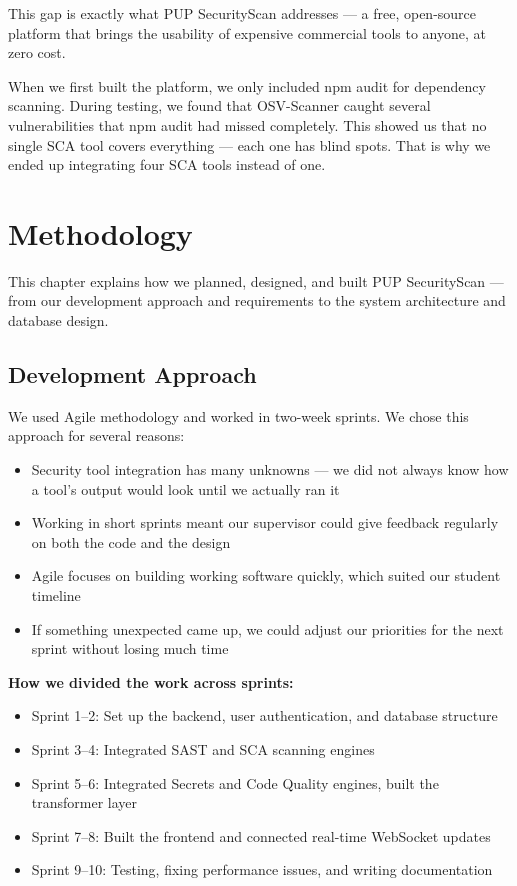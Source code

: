 \documentclass[12pt,a4paper]{report}
\begin{document}
This gap is exactly what PUP SecurityScan addresses --- a free, open-source platform that brings the usability of expensive commercial tools to anyone, at zero cost.

\begin{failbox}
When we first built the platform, we only included npm audit for dependency scanning. During testing, we found that OSV-Scanner caught several vulnerabilities that npm audit had missed completely. This showed us that no single SCA tool covers everything --- each one has blind spots. That is why we ended up integrating four SCA tools instead of one.
\end{failbox}

\chapter{Methodology}
\label{chap:methodology}

This chapter explains how we planned, designed, and built PUP SecurityScan --- from our development approach and requirements to the system architecture and database design.

\section{Development Approach}

We used Agile methodology and worked in two-week sprints. We chose this approach for several reasons:

\begin{itemize}
    \item Security tool integration has many unknowns --- we did not always know how a tool's output would look until we actually ran it
    \item Working in short sprints meant our supervisor could give feedback regularly on both the code and the design
    \item Agile focuses on building working software quickly, which suited our student timeline
    \item If something unexpected came up, we could adjust our priorities for the next sprint without losing much time
\end{itemize}

\textbf{How we divided the work across sprints:}
\begin{itemize}
    \item Sprint 1--2: Set up the backend, user authentication, and database structure
    \item Sprint 3--4: Integrated SAST and SCA scanning engines
    \item Sprint 5--6: Integrated Secrets and Code Quality engines, built the transformer layer
    \item Sprint 7--8: Built the frontend and connected real-time WebSocket updates
    \item Sprint 9--10: Testing, fixing performance issues, and writing documentation
\end{itemize}
\end{document}
